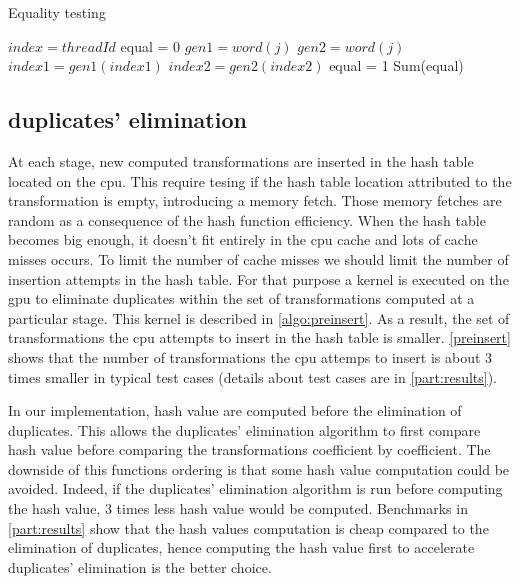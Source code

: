 {\begin{algorithm}
\caption{Equality testing}
\label{algo:equal}
\begin{algorithmic}
\STATE $index = threadId$
\STATE equal = 0
\STATE $gen1 = word(j)$
\STATE $gen2 = word(j)$
\STATE $index1 = gen1(index1)$
\STATE $index2 = gen2(index2)$
\ENDFOR
{}
\STATE equal = 1
\ENDIF
\ENDIF
\STATE Sum(equal)
\end{algorithmic}
\end{algorithm}

\subsection{duplicates' elimination}
\label{part:preinsert}
At each stage, new computed transformations are inserted in the hash table located on the \gls{cpu}. 
This require tesing if the hash table location attributed to the transformation is empty, introducing a memory fetch. 
Those memory fetches are random as a consequence of the hash function efficiency. 
When the hash table becomes big enough, it doesn't fit entirely in the \gls{cpu} cache and lots of cache misses occurs.
To limit the number of cache misses we should limit the number of insertion attempts in the hash table. 
For that purpose a kernel is executed on the \gls{gpu} to eliminate duplicates within the set of transformations computed at a particular stage. 
This kernel is described in \autoref{algo:preinsert}. 
As a result, the set of transformations the \gls{cpu} attempts to insert in the hash table is smaller. 
\autoref{preinsert} shows that the number of transformations the \gls{cpu} attemps to insert is about 3 times smaller in typical test cases 
(details about test cases are in \autoref{part:results}).

In our implementation, hash value are computed before the elimination of duplicates. 
This allows the duplicates' elimination algorithm to first compare hash value before comparing the transformations coefficient by coefficient. 
The downside of this functions ordering is that some hash value computation could be avoided. 
Indeed, if the duplicates' elimination algorithm is run before computing the hash value, 3 times less hash value would be computed. 
Benchmarks in \autoref{part:results} show that the hash values computation is cheap compared to the elimination of duplicates, 
hence computing the hash value first to accelerate duplicates' elimination is the better choice.

}
